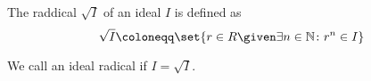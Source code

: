 The raddical $\sqrt{I}$ of an ideal $I$ is defined as
\[ \sqrt{I}\coloneqq \set{r \in R\given \exists n \in \mathbb{N}\colon r^n \in I} \]

We call an ideal radical if $I = \sqrt{I}$.
